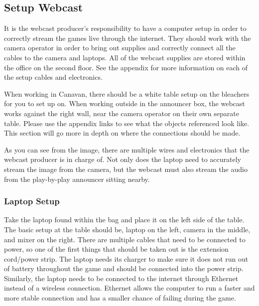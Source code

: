 \documentclass{article}
\begin{document}
\subsection{Setup Webcast}
It is the webcast producer’s responsibility to have a computer setup in order to correctly stream the games live through the internet. They should work with the camera operator in order to bring out supplies and correctly connect all the cables to the camera and laptops. All of the webcast supplies are stored within the office on the second floor. See the appendix for more information on each of the setup cables and electronics. 


When working in Canavan, there should be a white table setup on the bleachers for you to set up on. When working outside in the announcer box, the webcast works against the right wall, near the camera operator on their own separate table. Please use the appendix links to see what the objects referenced look like. This section will go more in depth on where the connections should be made. 


As you can see from the image, there are multiple wires and electronics that the webcast producer is in charge of. Not only does the laptop need to accurately stream the image from the camera, but the webcast must also stream the audio from the play-by-play announcer sitting nearby. 

\subsubsection{Laptop Setup}
Take the laptop found within the bag and place it on the left side of the table. The basic setup at the table should be, laptop on the left, camera in the middle, and mixer on the right. There are multiple cables that need to be connected to power, so one of the first things that should be taken out is the extension cord/power strip. The laptop needs its charger to make sure it does not run out of battery throughout the game and should be connected into the power strip. Similarly, the laptop needs to be connected to the internet through Ethernet instead of a wireless connection. Ethernet allows the computer to run a faster and more stable connection and has a smaller chance of failing during the game.

\end{document}

